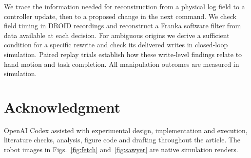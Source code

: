 \documentclass[letterpaper, 10 pt, conference]{ieeeconf}
\begin{document}
We trace the information needed for reconstruction from a physical log field to a controller update, then to a proposed change in the next command. We check field timing in DROID recordings and reconstruct a Franka software filter from data available at each decision. For ambiguous origins we derive a sufficient condition for a specific rewrite and check its delivered writes in closed-loop simulation. Paired replay trials establish how these write-level findings relate to hand motion and task completion. All manipulation outcomes are measured in simulation.






\section*{Acknowledgment}
OpenAI Codex assisted with experimental design, implementation and execution, literature checks, analysis, figure code and drafting throughout the article. The robot images in Figs.~\ref{fig:fetch} and~\ref{fig:sawyer} are native simulation renders.



\end{document}
